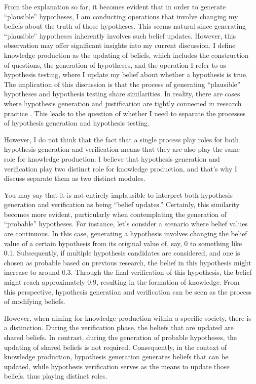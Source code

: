 From the explanation so far, it becomes evident that in order to generate ``plausible'' hypotheses, I am conducting operations that involve changing my beliefs about the truth of those hypotheses. This seems natural since generating ``plausible'' hypotheses inherently involves such belief updates. However, this observation may offer significant insights into my current discussion. I define knowledge production as the updating of beliefs, which includes the construction of questions, the generation of hypotheses, and the operation I refer to as hypothesis testing, where I update my belief about whether a hypothesis is true. The implication of this discussion is that the process of generating ``plausible'' hypotheses and hypothesis testing share similarities. In reality, there are cases where hypothesis generation and justification are tightly connected in research practice \cite{arabatzis2006inextricability}. This leads to the question of whether I need to separate the processes of hypothesis generation and hypothesis testing.

However, I do not think that the fact that a single process play roles for both hypothesis generation and verification means that they are also play the same role for knowledge production. I believe that hypothesis generation and verification play two distinct role for knowledge production, and that's why I discuss separate them as two distinct modules.

You may say that it is not entirely implausible to interpret both hypothesis generation and verification as being ``belief updates.'' Certainly, this similarity becomes more evident, particularly when contemplating the generation of ``probable'' hypotheses. For instance, let's consider a scenario where belief values are continuous. In this case, generating a hypothesis involves changing the belief value of a certain hypothesis from its original value of, say, 0 to something like 0.1. Subsequently, if multiple hypothesis candidates are considered, and one is chosen as probable based on previous research, the belief in this hypothesis might increase to around 0.3. Through the final verification of this hypothesis, the belief might reach approximately 0.9, resulting in the formation of knowledge. From this perspective, hypothesis generation and verification can be seen as the process of modifying beliefs.

However, when aiming for knowledge production within a specific society, there is a distinction. During the verification phase, the beliefs that are updated are shared beliefs. In contrast, during the generation of probable hypotheses, the updating of shared beliefs is not required. Consequently, in the context of knowledge production, hypothesis generation generates beliefs that can be updated, while hypothesis verification serves as the means to update those beliefs, thus playing distinct roles.

